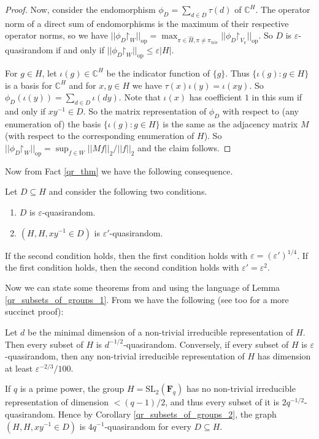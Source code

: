 \documentclass[10pt]{article}
\begin{document}
{\begin{proof}
Now, consider the endomorphism $\phi_D=\sum_{d\in D}\tau(d)$ of $\mathbb{C}^H$. The operator norm of a direct sum of endomorphisms is the maximum of their respective operator norms, so we have $||\phi_D\mathord{\upharpoonright}_W||_{\mathrm{op}}=\max_{\pi\in\widehat{H},\pi\neq\pi_{\mathrm{triv}}}||\phi_D\mathord{\upharpoonright}_{V_\pi}||_{\mathrm{op}}$. So $D$ is $\varepsilon$-quasirandom if and only if $||\phi_D\mathord{\upharpoonright}_W||_{\mathrm{op}}\leqslant\varepsilon |H|$.

For $g\in H$, let $\iota(g)\in\mathbb{C}^H$ be the indicator function of $\{g\}$. Thus $\{\iota(g):g\in H\}$ is a basis for $\mathbb{C}^H$ and for $x,y\in H$ we have $\tau(x)\iota(y)=\iota(xy)$. So $\phi_D(\iota(y))=\sum_{d\in D}\iota(dy)$. Note that $\iota(x)$ has coefficient $1$ in this sum if and only if $xy^{-1}\in D$. So the matrix representation of $\phi_D$ with respect to (any enumeration of) the basis $\{\iota(g):g\in H\}$ is the same as the adjacency matrix $M$ (with respect to the corresponding enumeration of $H$). So $||\phi_D\mathord{\upharpoonright}_W||_{\mathrm{op}}=\sup_{f\in W}||Mf||_2/||f||_2$ and the claim follows.
\end{proof}

Now from Fact \ref{qr_thm} we have the following consequence.

\begin{corollary}\label{qr_subsets_of_groups_2}
    Let $D\subseteq H$ and consider the following two conditions.
    \begin{enumerate}
        \item $D$ is $\varepsilon$-quasirandom.
        \item $(H,H,xy^{-1}\in D)$ is $\varepsilon'$-quasirandom.
    \end{enumerate} If the second condition holds, then the first condition holds with $\varepsilon=(\varepsilon')^{1/4}$. If the first condition holds, then the second condition holds with $\varepsilon'=\varepsilon^2$.
\end{corollary}

Now we can state some theorems from \cite{gowers_groups} and \cite{green} using the language of Lemma \ref{qr_subsets_of_groups_1}. From \cite{gowers_groups} we have the following (see \cite{breuillard} too for a more succinct proof):

\begin{fact}\label{qr_dimension}
    Let $d$ be the minimal dimension of a non-trivial irreducible representation of $H$. Then every subset of $H$ is $d^{-1/2}$-quasirandom. Conversely, if every subset of $H$ is $\varepsilon$-quasirandom, then any non-trivial irreducible representation of $H$ has dimension at least $\varepsilon^{-2/3}/100$.
\end{fact}
\begin{example}\label{sl2_example}
    If $q$ is a prime power, the group $H=\mathrm{SL}_2(\mathbf{F}_q)$ has no non-trivial irreducible representation of dimension $<(q-1)/2$, and thus every subset of it is $2q^{-1/2}$-quasirandom. Hence by Corollary \ref{qr_subsets_of_groups_2}, the graph $(H,H,xy^{-1}\in D)$ is $4q^{-1}$-quasirandom for every $D\subseteq H$.
\end{example}

}
\end{document}
